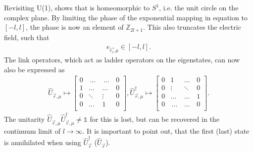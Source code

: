 Revisiting U(1), shows that is homeomorphic to $S^1$, i.e. the unit circle on the complex plane. By limiting the phase of the exponential mapping in equation  to $[-l, l]$, the phase is now an element of $\mathbb{Z}_{2l+1}$. This also truncates the electric field, such that
\begin{align}
e_{\vec{r_i}, \mu}\in[-l, l].
\end{align}
The link operators, which act as ladder operators on the eigenstates, can now also be expressed as
\begin{align*}
	\hat{U}_{\vec{r}, \mu} \mapsto \begin{bmatrix}
		                               0 & \,\dots\, & \,\dots \, & 0 \\
		                               1 & \dots     & \dots      & 0 \\
		                               0 & \ddots    & \vdots     & 0 \\
		                               0 & \dots     & 1          & 0 \\
	                               \end{bmatrix}, \hat{U}_{\vec{r}, \mu}^{\dag} \mapsto \begin{bmatrix}
		                                                                                    0 & 1          & \dots    & 0 \\
		                                                                                    0 & \vdots     & \ddots   & 0 \\
		                                                                                    0 & \dots      & \dots    & 1 \\
		                                                                                    0 & \,\dots \, & \dots \, & 0 \\
	                                                                                    \end{bmatrix}.
\end{align*}
The unitarity $\hat{U}_{\vec{r}, \mu}\hat{U}_{\vec{r}, \mu}^\dag\neq\mathds{1}$ for this is lost, but can be recovered in the continuum limit of $l\rightarrow\infty$. It is important to point out, that the first (last) state is annihilated when using $\hat{U}_{\vec{r}}^{\dag}$ ($\hat{U}_{\vec{r}}$).
